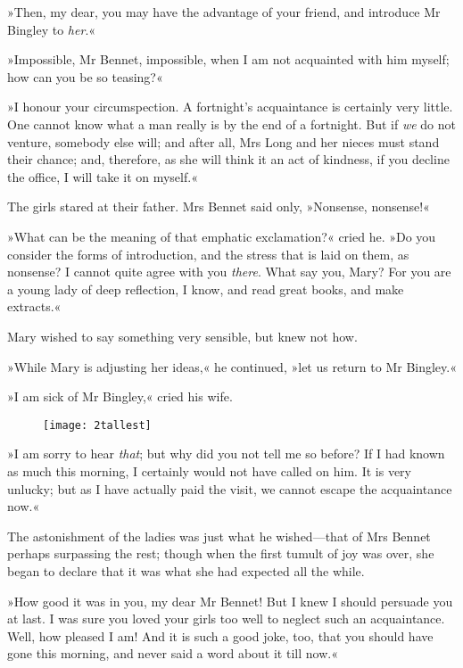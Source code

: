 »Then, my dear, you may have the advantage of your friend, and introduce Mr Bingley to \textit{her}.«

»Impossible, Mr Bennet, impossible, when I am not acquainted with him myself; how can you be so teasing?«

»I honour your circumspection. A fortnight's acquaintance is certainly very little. One cannot know what a man really is by the end of a fortnight. But if \textit{we} do not venture, somebody else will; and after all, Mrs Long and her nieces must stand their chance; and, therefore, as she will think it an act of kindness, if you decline the office, I will take it on myself.«

The girls stared at their father. Mrs Bennet said only, »Nonsense, nonsense!«

»What can be the meaning of that emphatic exclamation?« cried he. »Do you consider the forms of introduction, and the stress that is laid on them, as nonsense? I cannot quite agree with you \textit{there}. What say you, Mary? For you are a young lady of deep reflection, I know, and read great books, and make extracts.«

Mary wished to say something very sensible, but knew not how.

»While Mary is adjusting her ideas,« he continued, »let us return to Mr Bingley.«

»I am sick of Mr Bingley,« cried his wife.

\begin{figure}[tbh!]
\centering
\texttt{[image: 2tallest]}
\end{figure}

»I am sorry to hear \textit{that}; but why did you not tell me so before? If I had known as much this morning, I certainly would not have called on him. It is very unlucky; but as I have actually paid the visit, we cannot escape the acquaintance now.«

The astonishment of the ladies was just what he wished—that of Mrs Bennet perhaps surpassing the rest; though when the first tumult of joy was over, she began to declare that it was what she had expected all the while.

»How good it was in you, my dear Mr Bennet! But I knew I should persuade you at last. I was sure you loved your girls too well to neglect such an acquaintance. Well, how pleased I am! And it is such a good joke, too, that you should have gone this morning, and never said a word about it till now.«

